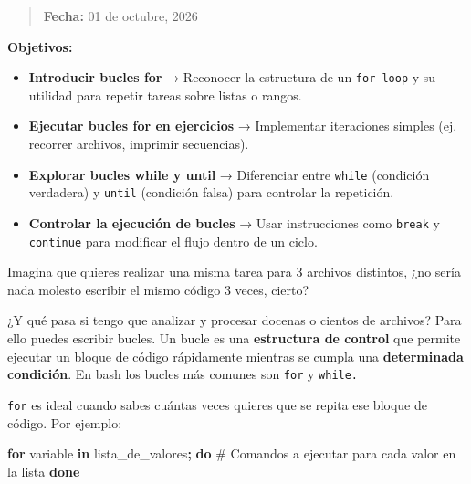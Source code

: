 \documentclass[
  spanish,
  12pt,
  letterpaper,
  DIV=11,
  numbers=noendperiod]{scrreprt}
\newenvironment{Shaded}{\begin{snugshade}}{\end{snugshade}}
\newcommand{\CommentTok}[1]{\textcolor[rgb]{0.37,0.37,0.37}{#1}}
\newcommand{\ControlFlowTok}[1]{\textcolor[rgb]{0.00,0.23,0.31}{\textbf{#1}}}
\newcommand{\KeywordTok}[1]{\textcolor[rgb]{0.00,0.23,0.31}{\textbf{#1}}}
\newcommand{\NormalTok}[1]{\textcolor[rgb]{0.00,0.23,0.31}{#1}}
\providecommand{\tightlist}{%
  \setlength{\itemsep}{0pt}\setlength{\parskip}{0pt}}
\begin{document}
\begin{quote}
\textbf{Fecha:} 01 de octubre, 2026
\end{quote}

\textbf{Objetivos:}

\begin{itemize}
\tightlist
\item
  \textbf{Introducir bucles for} → Reconocer la estructura de un
  \texttt{for\ loop} y su utilidad para repetir tareas sobre listas o
  rangos.
\item
  \textbf{Ejecutar bucles for en ejercicios} → Implementar iteraciones
  simples (ej. recorrer archivos, imprimir secuencias).
\item
  \textbf{Explorar bucles while y until} → Diferenciar entre
  \texttt{while} (condición verdadera) y \texttt{until} (condición
  falsa) para controlar la repetición.
\item
  \textbf{Controlar la ejecución de bucles} → Usar instrucciones como
  \texttt{break} y \texttt{continue} para modificar el flujo dentro de
  un ciclo.
\end{itemize}

Imagina que quieres realizar una misma tarea para 3 archivos distintos,
¿no sería nada molesto escribir el mismo código 3 veces, cierto?

¿Y qué pasa si tengo que analizar y procesar docenas o cientos de
archivos? Para ello puedes escribir bucles. Un bucle es una
\textbf{estructura de control} que permite ejecutar un bloque de código
rápidamente mientras se cumpla una \textbf{determinada condición}. En
bash los bucles más comunes son \texttt{for} y \texttt{while.}

\begin{tcolorbox}[enhanced jigsaw, arc=.35mm, bottomrule=.15mm, bottomtitle=1mm, breakable, colback=white, colbacktitle=quarto-callout-note-color!10!white, colframe=quarto-callout-note-color-frame, coltitle=black, left=2mm, leftrule=.75mm, opacityback=0, opacitybacktitle=0.6, rightrule=.15mm, title={For}, titlerule=0mm, toprule=.15mm, toptitle=1mm]

\texttt{for} es ideal cuando sabes cuántas veces quieres que se repita
ese bloque de código. Por ejemplo:

\end{tcolorbox}

\begin{Shaded}
\begin{Highlighting}[]
\ControlFlowTok{for}\NormalTok{ variable }\KeywordTok{in}\NormalTok{ lista\_de\_valores}\KeywordTok{;} \ControlFlowTok{do}
  \CommentTok{\# Comandos a ejecutar para cada valor en la lista}
\ControlFlowTok{done}
\end{Highlighting}
\end{Shaded}
\end{document}
